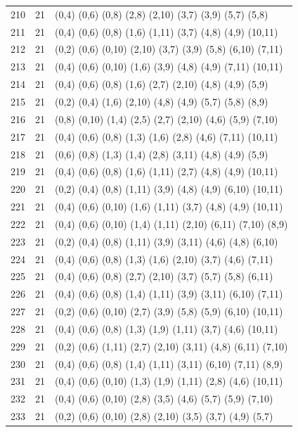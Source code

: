 {\begin{longtable}{lll}
210 & 21 & (0,4) (0,6) (0,8) (2,8) (2,10) (3,7) (3,9) (5,7) (5,8) \\
211 & 21 & (0,4) (0,6) (0,8) (1,6) (1,11) (3,7) (4,8) (4,9) (10,11) \\
212 & 21 & (0,2) (0,6) (0,10) (2,10) (3,7) (3,9) (5,8) (6,10) (7,11) \\
213 & 21 & (0,4) (0,6) (0,10) (1,6) (3,9) (4,8) (4,9) (7,11) (10,11) \\
214 & 21 & (0,4) (0,6) (0,8) (1,6) (2,7) (2,10) (4,8) (4,9) (5,9) \\
215 & 21 & (0,2) (0,4) (1,6) (2,10) (4,8) (4,9) (5,7) (5,8) (8,9) \\
216 & 21 & (0,8) (0,10) (1,4) (2,5) (2,7) (2,10) (4,6) (5,9) (7,10) \\
217 & 21 & (0,4) (0,6) (0,8) (1,3) (1,6) (2,8) (4,6) (7,11) (10,11) \\
218 & 21 & (0,6) (0,8) (1,3) (1,4) (2,8) (3,11) (4,8) (4,9) (5,9) \\
219 & 21 & (0,4) (0,6) (0,8) (1,6) (1,11) (2,7) (4,8) (4,9) (10,11) \\
220 & 21 & (0,2) (0,4) (0,8) (1,11) (3,9) (4,8) (4,9) (6,10) (10,11) \\
221 & 21 & (0,4) (0,6) (0,10) (1,6) (1,11) (3,7) (4,8) (4,9) (10,11) \\
222 & 21 & (0,4) (0,6) (0,10) (1,4) (1,11) (2,10) (6,11) (7,10) (8,9) \\
223 & 21 & (0,2) (0,4) (0,8) (1,11) (3,9) (3,11) (4,6) (4,8) (6,10) \\
224 & 21 & (0,4) (0,6) (0,8) (1,3) (1,6) (2,10) (3,7) (4,6) (7,11) \\
225 & 21 & (0,4) (0,6) (0,8) (2,7) (2,10) (3,7) (5,7) (5,8) (6,11) \\
226 & 21 & (0,4) (0,6) (0,8) (1,4) (1,11) (3,9) (3,11) (6,10) (7,11) \\
227 & 21 & (0,2) (0,6) (0,10) (2,7) (3,9) (5,8) (5,9) (6,10) (10,11) \\
228 & 21 & (0,4) (0,6) (0,8) (1,3) (1,9) (1,11) (3,7) (4,6) (10,11) \\
229 & 21 & (0,2) (0,6) (1,11) (2,7) (2,10) (3,11) (4,8) (6,11) (7,10) \\
230 & 21 & (0,4) (0,6) (0,8) (1,4) (1,11) (3,11) (6,10) (7,11) (8,9) \\
231 & 21 & (0,4) (0,6) (0,10) (1,3) (1,9) (1,11) (2,8) (4,6) (10,11) \\
232 & 21 & (0,4) (0,6) (0,10) (2,8) (3,5) (4,6) (5,7) (5,9) (7,10) \\
233 & 21 & (0,2) (0,6) (0,10) (2,8) (2,10) (3,5) (3,7) (4,9) (5,7) \\

\end{longtable}}
